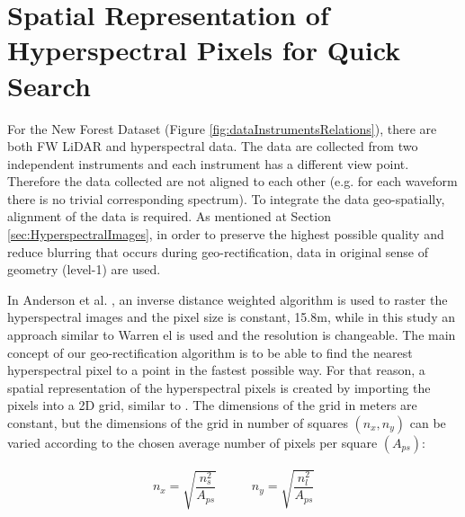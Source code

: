 \documentclass{subfiles}
\begin{document}
	
	
	

	


	
\section{Spatial Representation of Hyperspectral Pixels for Quick Search}\label{sec:SpatialRepresentation}


	\par For the New Forest Dataset (Figure \ref{fig:dataInstrumentsRelations}), there are both FW LiDAR and hyperspectral data. {\color{blue} The data are collected from two independent instruments and each instrument has a different view point. Therefore the data collected are not aligned to each other (e.g. for each waveform there is no trivial corresponding spectrum).} To integrate the data geo-spatially, alignment of the data is required.  As mentioned at Section \ref{sec:HyperspectralImages}, in order to preserve the highest possible quality and reduce blurring that occurs during geo-rectification, data in original sense of geometry (level-1) are used.
	
	\par In Anderson et al. \cite{Anderson2008}, an inverse distance weighted algorithm is used to raster the hyperspectral images and the pixel size is constant, 15.8m, while in this study an approach similar to Warren el \cite{Warren2014} is used and the resolution is changeable. The main concept of our geo-rectification algorithm is to be able to find the nearest hyperspectral pixel to a point in the fastest possible way. For that reason, a spatial representation of the hyperspectral pixels is created by importing the pixels into a 2D grid, similar to \cite{Warren2014}. The dimensions of the grid in meters are constant, but the dimensions of the grid in number of squares $(n_x, n_y)$ can be varied according to the chosen average number of pixels per square $(A_{ps})$: 
	
	\begin{eqnarray}
		n_x=\sqrt{\dfrac{n_s^2}{A_{ps}}} \;\;\;\;\;\;\;\;\;\; n_y=\sqrt{\dfrac{n_l^2}{A_{ps}}}   
	\end{eqnarray} 
	
\end{document}
